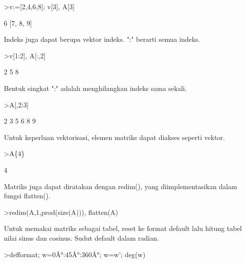 \documentclass[a4paper,10pt]{article}
\begin{document}
\begin{eulernotebook}
\begin{eulercomment}
\begin{eulercomment}
\begin{eulercomment}
\begin{eulercomment}
\begin{eulercomment}
\begin{eulercomment}
\begin{eulercomment}
\begin{eulercomment}
\begin{eulercomment}
\begin{eulercomment}
\begin{eulercomment}
\begin{eulercomment}
\begin{eulercomment}
\begin{eulercomment}
\begin{eulercomment}
\begin{eulercomment}
\begin{eulerprompt}
>v:=[2,4,6,8]; v[3], A[3]
\end{eulerprompt}
\begin{euleroutput}
  6
  [7,  8,  9]
\end{euleroutput}
\begin{eulercomment}
Indeks juga dapat berupa vektor indeks. ":" berarti semua indeks.
\end{eulercomment}
\begin{eulerprompt}
>v[1:2], A[:,2]
\end{eulerprompt}
\begin{euleroutput}
  [2,  4]
              2 
              5 
              8 
\end{euleroutput}
\begin{eulercomment}
Bentuk singkat ":" adalah menghilangkan indeks sama sekali.
\end{eulercomment}
\begin{eulerprompt}
>A[,2:3]
\end{eulerprompt}
\begin{euleroutput}
              2             3 
              5             6 
              8             9 
\end{euleroutput}
\begin{eulercomment}
Untuk keperluan vektorisasi, elemen matriks dapat diakses seperti vektor.
\end{eulercomment}
\begin{eulerprompt}
>A\{4\}
\end{eulerprompt}
\begin{euleroutput}
  4
\end{euleroutput}
\begin{eulercomment}
Matriks juga dapat diratakan dengan redim(), yang diimplementasikan dalam
fungsi flatten().
\end{eulercomment}
\begin{eulerprompt}
>redim(A,1,prod(size(A))), flatten(A)
\end{eulerprompt}
\begin{euleroutput}
  [1,  2,  3,  4,  5,  6,  7,  8,  9]
  [1,  2,  3,  4,  5,  6,  7,  8,  9]
\end{euleroutput}
\begin{eulercomment}
Untuk memakai matriks sebagai tabel, reset ke format default lalu hitung
tabel nilai sinus dan cosinus. Sudut default dalam radian.
\end{eulercomment}
\begin{eulerprompt}
>defformat; w=0Â°:45Â°:360Â°; w=w'; deg(w)
\end{eulerprompt}

\end{eulercomment}
\end{eulercomment}
\end{eulercomment}
\end{eulercomment}
\end{eulercomment}
\end{eulercomment}
\end{eulercomment}
\end{eulercomment}
\end{eulercomment}
\end{eulercomment}
\end{eulercomment}
\end{eulercomment}
\end{eulercomment}
\end{eulercomment}
\end{eulercomment}
\end{eulercomment}
\end{eulernotebook}
\end{document}
